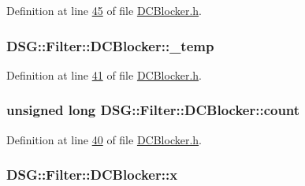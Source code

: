 Definition at line \hyperlink{_d_c_blocker_8h_source_l00045}{45} of file \hyperlink{_d_c_blocker_8h_source}{D\+C\+Blocker.\+h}.

\hypertarget{class_d_s_g_1_1_filter_1_1_d_c_blocker_a4a698e11be27e8613f5b5146df9c4599}{
\subsubsection[{\+\_\+temp}]{ D\+S\+G\+::\+Filter\+::\+D\+C\+Blocker\+::\+\_\+temp\hspace{0.3cm}{\ttfamily [protected]}}}\label{class_d_s_g_1_1_filter_1_1_d_c_blocker_a4a698e11be27e8613f5b5146df9c4599}


Definition at line \hyperlink{_d_c_blocker_8h_source_l00041}{41} of file \hyperlink{_d_c_blocker_8h_source}{D\+C\+Blocker.\+h}.

\hypertarget{class_d_s_g_1_1_filter_1_1_d_c_blocker_a2a045707b5b79e7a4330c87156f7b344}{
\subsubsection[{count}]{\setlength{\rightskip}{0pt plus 5cm}unsigned long D\+S\+G\+::\+Filter\+::\+D\+C\+Blocker\+::count\hspace{0.3cm}{\ttfamily [protected]}}}\label{class_d_s_g_1_1_filter_1_1_d_c_blocker_a2a045707b5b79e7a4330c87156f7b344}


Definition at line \hyperlink{_d_c_blocker_8h_source_l00040}{40} of file \hyperlink{_d_c_blocker_8h_source}{D\+C\+Blocker.\+h}.

\hypertarget{class_d_s_g_1_1_filter_1_1_d_c_blocker_aacb82cec9c34b8afe19fe2c7830eb05a}{
\subsubsection[{x}]{ D\+S\+G\+::\+Filter\+::\+D\+C\+Blocker\+::x\hspace{0.3cm}{\ttfamily [protected]}}}\label{class_d_s_g_1_1_filter_1_1_d_c_blocker_aacb82cec9c34b8afe19fe2c7830eb05a}


